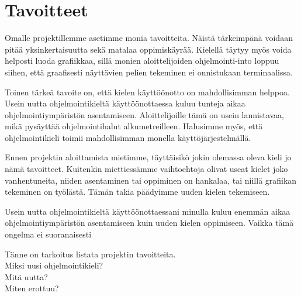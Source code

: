 \section{Tavoitteet}
Omalle projektillemme asetimme monia tavoitteita.
Näistä tärkeimpänä voidaan pitää yksinkertaisuutta
sekä matalaa oppimiskäyrää.
Kielellä täytyy myös voida helposti luoda grafiikkaa,
sillä monien aloittelijoiden ohjelmointi-into loppuu siihen,
että graafisesti näyttävien pelien tekeminen ei onnistukaan terminaalissa.

Toinen tärkeä tavoite on,
että kielen käyttöönotto on mahdollisimman helppoa.
Usein uutta ohjelmointikieltä käyttöönottaessa
kuluu tunteja aikaa ohjelmointiympäristön asentamiseen.
Aloittelijoille tämä on usein lannistavaa,
mikä pysäyttää ohjelmointihalut alkumetreilleen.
Halusimme myös, että ohjelmointikieli toimii mahdollisimman monella käyttöjärjestelmällä.

Ennen projektin aloittamista mietimme,
täyttäisikö jokin olemassa oleva kieli jo nämä tavoitteet.
Kuitenkin miettiessämme vaihtoehtoja
olivat useat kielet joko vanhentuneita,
niiden asentaminen tai oppiminen on hankalaa,
tai niillä grafiikan tekeminen on työlästä.
Tämän takia päädyimme uuden kielen tekemiseen.

Usein uutta ohjelmointikieltä käyttöönottaessani
minulla kuluu enemmän aikaa ohjelmointiympäristön asentamiseen
kuin uuden kielen oppimiseen.
Vaikka tämä ongelma ei suoranaisesti

Tänne on tarkoitus listata projektin tavoitteita.
\\
Miksi uusi ohjelmointikieli?
\\
Mitä uutta?
\\
Miten erottuu?